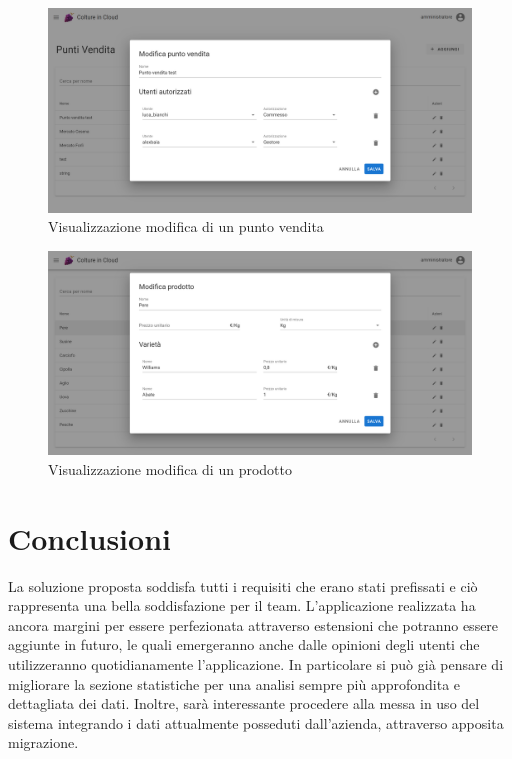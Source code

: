 \documentclass[italian]{report}
\begin{document}
\begin{figure}[htp]
    \centering
    \includegraphics[width=\textwidth]{assets/final_edit_store.png}
    \caption{Visualizzazione modifica di un punto vendita}
    \label{fig:stores}
\end{figure}
\begin{figure}[htp]
    \centering
    \includegraphics[width=\textwidth]{assets/final_edit_product.png}
    \caption{Visualizzazione modifica di un prodotto}
    \label{fig:updateProduct}
\end{figure}

\chapter{Conclusioni}
La soluzione proposta soddisfa tutti i requisiti che erano stati prefissati e ciò rappresenta una bella soddisfazione per il team.
L'applicazione realizzata ha ancora margini per essere perfezionata attraverso estensioni che potranno essere aggiunte in futuro, le quali emergeranno anche dalle opinioni degli utenti che utilizzeranno quotidianamente l'applicazione. In particolare si può già pensare di migliorare la sezione statistiche per una analisi sempre più approfondita e dettagliata dei dati. Inoltre, sarà interessante procedere alla messa in uso del sistema integrando i dati attualmente posseduti dall'azienda, attraverso apposita migrazione.
\end{document}
